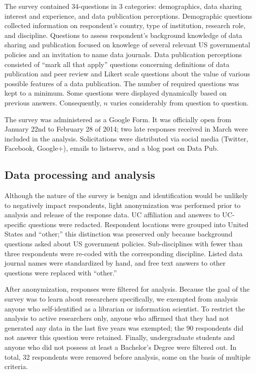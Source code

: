 \documentclass[10pt]{article}
\begin{document}
The survey contained 34-questions in 3 categories: demographics, data sharing interest and experience, and data publication perceptions.
Demographic questions collected information on respondent's country, type of institution, research role, and discipline.
Questions to assess respondent's background knowledge of data sharing and publication focused on knowlege of several relevant US governmental policies and an invitation to name data journals.
Data publication perceptions consisted of ``mark all that apply'' questions concerning definitions of data publication and peer review and Likert scale questions about the value of various possible features of a data publication.
The number of required questions was kept to a minimum.
Some questions were displayed dynamically based on previous answers. 
Consequently, $n$ varies considerably from question to question.

The survey was administered as a Google Form.
It was officially open from January 22nd to February 28 of 2014; two late responses received in March were included in the analysis.
Solicitations were distributed via social media (Twitter, Facebook, Google+), emails to listservs, and a blog post on Data Pub\cite{kratz_data_2014}.

\subsection*{Data processing and analysis}
Although the nature of the survey is benign and identification would be unlikely to negatively impact respondents, light anonymization was performed prior to analysis and release of the response data.
UC affiliation and answers to UC-specific questions were redacted.
Respondent locations were grouped into United States and ``other;'' this distinction was preserved only because background questions asked about US government policies.  
Sub-disciplines with fewer than three respondents were re-coded with the corresponding discipline.
Listed data journal names were standardized by hand, and free text answers to other questions were replaced with ``other.''

After anonymization, responses were filtered for analysis.
Because the goal of the survey was to learn about researchers specifically, we exempted from analysis anyone who self-identified as a librarian or information scientist.
To restrict the analysis to active researchers only, anyone who affirmed that they had not generated any data in the last five years was exempted; the 90 respondents did not answer this question were retained.
Finally, undergraduate students and anyone who did not possess at least a Bachelor's Degree were filtered out.
In total, 32 respondents were removed before analysis, some on the basis of multiple criteria.
\end{document}
